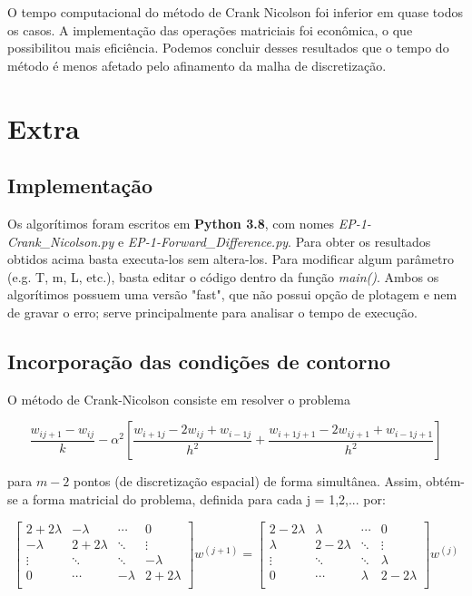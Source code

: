 \documentclass[11pt]{article}
\begin{document}
O tempo computacional do método de Crank Nicolson foi inferior em quase todos os casos. A implementação das operações matriciais foi econômica, o que possibilitou mais eficiência. Podemos concluir desses resultados que o tempo do método é menos afetado pelo afinamento da malha de discretização.\\

\section*{Extra}

\subsection*{Implementação}


Os algorítimos foram escritos em \textbf{Python 3.8}, com nomes \textit{EP-1-Crank\_Nicolson.py} e \textit{EP-1-Forward\_Difference.py}. Para obter os resultados obtidos acima basta executa-los sem altera-los. Para modificar algum parâmetro (e.g. T, m, L, etc.), basta editar o código dentro da função \textit{main()}. Ambos os algorítimos possuem uma versão "fast", que não possui opção de plotagem e nem de gravar o erro; serve principalmente para analisar o tempo de execução.

\subsection*{Incorporação das condições de contorno}

O método de Crank-Nicolson consiste em resolver o problema

	$$\frac{w_{ij+1} - w_{ij}}{k} - \alpha^2[\frac{w_{i+1j} - 2w_{ij} + w_{i-1j}}{h^2} + \frac{w_{i+1j+1} - 2w_{ij+1} + w_{i-1j+1}}{h^2}]$$
	
para $m-2$ pontos (de discretização espacial) de forma simultânea. Assim, obtém-se a forma matricial do problema, definida para cada j = 1,2,...  por:

	\begin{equation}
	\begin{bmatrix}
	2+2\lambda & -\lambda & \cdots & 0 \\
	-\lambda & 2+2\lambda & \ddots & \vdots\\
	\vdots & \ddots & \ddots & -\lambda\\
	0 & \cdots & -\lambda & 2+2\lambda\\
	\end{bmatrix}w^{(j+1)} = 
	\begin{bmatrix}
	2-2\lambda & \lambda & \cdots & 0 \\
	\lambda & 2-2\lambda & \ddots & \vdots\\
	\vdots & \ddots & \ddots & \lambda\\
	0 & \cdots & \lambda & 2-2\lambda\\
	\end{bmatrix}w^{(j)}
	\end{equation}
\end{document}
